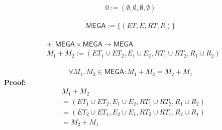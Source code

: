 \documentclass[runningheads,a4paper]{llncs}
\newcommand{\MEGA}{\mathsf{MEGA}}
\begin{document}
\begin{definition}
\begin{align}
0 := (\emptyset,\emptyset,\emptyset,\emptyset)
\end{align}
\end{definition}

\begin{definition}
\begin{align}
\MEGA := \{ (ET,E,RT,R) \}
\end{align}
\end{definition}

\begin{definition}
\begin{align}
\begin{split}
& + : \MEGA \times \MEGA \rightarrow \MEGA
\\ & M_1 + M_2 := (ET_1 \cup ET_2, E_1 \cup E_2, RT_1 \cup RT_2, R_1 \cup R_2)
\end{split}
\end{align}
\end{definition}

\begin{proposition}
\label{prop:mega-inc-com}
\begin{align}
\forall M_1,M_2 \in \MEGA : M_1 + M_2 = M_2 + M_1 
\end{align}
\textbf{Proof:}
\begin{equation}
\begin{split}
& M_1 + M_2 
\\ & = (ET_1 \cup ET_2, E_1 \cup E_2, RT_1 \cup RT_2, R_1 \cup R_2)
\\ & = (ET_2 \cup ET_1, E_2 \cup E_1, RT_2 \cup RT_1, R_2 \cup R_1)
\\ & = M_2 + M_1
\end{split}
\end{equation}
\end{proposition}
\end{document}
